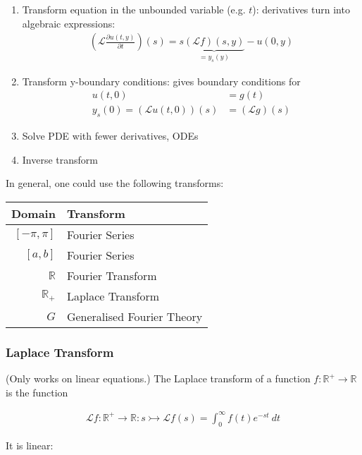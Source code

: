 \label{subsec:transformation}
\begin{enumerate}
    \item{
        Transform equation in the unbounded variable (e.g. $t$): derivatives turn into algebraic expressions:
        \begin{align*}
            \left(
            \mathcal{L}\frac{\partial u(t,y)}{\partial t}
            \right)(s) =
            s
            \underbrace{(\mathcal{L}f)(s, y)}_{=y_s(y)}
            -u(0,y)
        \end{align*}
    }
    \item{
        Transform y-boundary conditions: gives boundary conditions for
        \begin{align*}
            u(t,0) & =g(t) \\
            y_s(0)=(\mathcal{L}u(t,0))(s) & = (\mathcal{L}g)(s)
        \end{align*}
    }
    \item Solve PDE with fewer derivatives, ODEs
    \item Inverse transform
\end{enumerate}

In general, one could use the following transforms:

\begin{tabular}{r|l}
    Domain & Transform \\
    \hline
    $[-\pi, \pi]$ & Fourier Series \\
    $[a,b]$ & Fourier Series \\
    $\mathbb{R}$ & Fourier Transform \\
    $\mathbb{R}_+$ & Laplace Transform \\
    $G$ & Generalised Fourier Theory
\end{tabular}

\subsubsection{Laplace Transform}

(Only works on linear equations.)
The Laplace transform of a function $f:\mathbb{R}^+\to \mathbb{R}$ is the function

\begin{align*}
    \mathcal{L}f : \mathbb{R}^+\to \mathbb{R} : s \rightarrowtail \mathcal{L}f(s) = \int_0^\infty f(t)e^{-st}\ dt
\end{align*}

It is linear:

